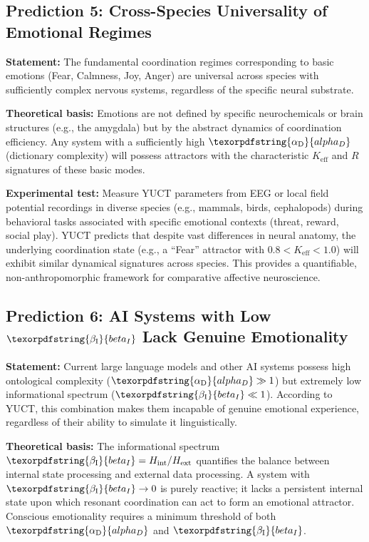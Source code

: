 \documentclass[12pt,a4paper]{article}
\DeclareRobustCommand{\alD}{\texorpdfstring{\ensuremath{\alpha_{\mathrm{D}}}}{alpha_D}}
\DeclareRobustCommand{\beI}{\texorpdfstring{\ensuremath{\beta_{\mathrm{I}}}}{beta_I}}
\begin{document}
	\subsection{Prediction 5: Cross-Species Universality of Emotional Regimes}
	
	\textbf{Statement:} The fundamental coordination regimes corresponding to basic emotions (Fear, Calmness, Joy, Anger) are universal across species with sufficiently complex nervous systems, regardless of the specific neural substrate.
	
	\textbf{Theoretical basis:} Emotions are not defined by specific neurochemicals or brain structures (e.g., the amygdala) but by the abstract dynamics of coordination efficiency. Any system with a sufficiently high \(\alD\) (dictionary complexity) will possess attractors with the characteristic \(K_{\mathrm{eff}}\) and \(R\) signatures of these basic modes.
	
	\textbf{Experimental test:} Measure YUCT parameters from EEG or local field potential recordings in diverse species (e.g., mammals, birds, cephalopods) during behavioral tasks associated with specific emotional contexts (threat, reward, social play). YUCT predicts that despite vast differences in neural anatomy, the underlying coordination state (e.g., a ``Fear'' attractor with \(0.8 < K_{\mathrm{eff}} < 1.0\)) will exhibit similar dynamical signatures across species. This provides a quantifiable, non-anthropomorphic framework for comparative affective neuroscience.
	
	\subsection{Prediction 6: AI Systems with Low \(\beI\) Lack Genuine Emotionality}
	
	\textbf{Statement:} Current large language models and other AI systems possess high ontological complexity (\(\alD \gg 1\)) but extremely low informational spectrum (\(\beI \ll 1\)). According to YUCT, this combination makes them incapable of genuine emotional experience, regardless of their ability to simulate it linguistically.
	
	\textbf{Theoretical basis:} The informational spectrum \(\beI = H_{\mathrm{int}}/H_{\mathrm{ext}}\) quantifies the balance between internal state processing and external data processing. A system with \(\beI \to 0\) is purely reactive; it lacks a persistent internal state upon which resonant coordination can act to form an emotional attractor. Conscious emotionality requires a minimum threshold of both \(\alD\) and \(\beI\).
	
\end{document}
